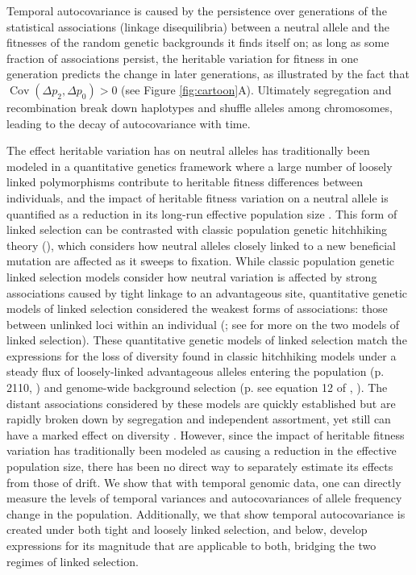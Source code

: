 \documentclass[11pt]{article}
\DeclareMathOperator{\cov}{Cov}
\begin{document}
Temporal autocovariance is caused by the persistence over generations of the
statistical associations (linkage disequilibria) between a neutral allele and
the fitnesses of the random genetic backgrounds it finds itself on; as long as
some fraction of associations persist, the heritable variation for fitness in
one generation predicts the change in later generations, as illustrated by the
fact that $\cov(\Delta p_2, \Delta p_0) > 0$ (see Figure \ref{fig:cartoon}A).
Ultimately segregation and recombination break down haplotypes and shuffle
alleles among chromosomes, leading to the decay of autocovariance with time. 

The effect heritable variation has on neutral alleles has traditionally been
modeled in a quantitative genetics framework where a large number of loosely
linked polymorphisms contribute to heritable fitness differences between
individuals, and the impact of heritable fitness variation on a neutral allele
is quantified as a reduction in its long-run effective population size
\parencite{Robertson1961-ho,Santiago1995-hx,Santiago1998-bs}.  This form of
linked selection can be contrasted with classic population genetic hitchhiking
theory (\cite{Maynard_Smith1974-lc}), which considers how neutral alleles
closely linked to a new beneficial mutation are affected as it sweeps to
fixation. While classic population genetic linked selection models consider how
neutral variation is affected by strong associations caused by tight linkage to
an advantageous site, quantitative genetic models of linked selection
considered the weakest forms of associations: those between unlinked loci
within an individual (\cite{Morley1954-yp, Robertson1961-ho, Santiago1995-hx};
see \cite{Barton2000-zg} for more on the two models of linked selection).
These quantitative genetic models of linked selection match the expressions for
the loss of diversity found in classic hitchhiking models under a steady flux
of loosely-linked advantageous alleles entering the population (p. 2110,
\cite{Santiago1998-bs}) and genome-wide background selection (p.  see equation
12 of \cite{Santiago1998-bs}, \cite{Nordborg1996-nq}).  The distant
associations considered by these models are quickly established but are rapidly
broken down by segregation and independent assortment, yet still can have a
marked effect on diversity \parencite{Robertson1961-ho,Santiago1995-hx}.
However, since the impact of heritable fitness variation has traditionally been
modeled as causing a reduction in the effective population size, there has been
no direct way to separately estimate its effects from those of drift. We show
that with temporal genomic data, one can directly measure the levels of
temporal variances and autocovariances of allele frequency change in the
population. Additionally, we that show temporal autocovariance is created under
both tight and loosely linked selection, and below, develop expressions for its
magnitude that are applicable to both, bridging the two regimes of linked
selection.
\end{document}
